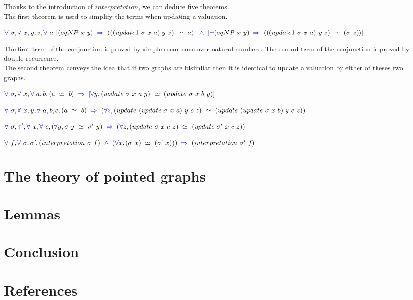 \documentclass[a4paper]{article}
\begin{document}
Thanks to the introduction of $interpretation$, we can deduce five theorems. \\

The first theorem is used to simplify the terms when updating a valuation.

\begin{theorem}
$\fa \ \sigma, \fa \ x, y, z, \fa \ a, [(eqNP \ x \ y) \ \imp \ (((update1 \ \sigma \ x \ a) \ y \ z) \ \simeq \ a)] \ \conj \ [\blneg(eqNP \ x \ y) \ \imp \ (((update1 \ \sigma \ x \ a) \ y \ z) \ \simeq \ (\sigma \ z))]$
\end{theorem}

The first term of the conjonction is proved by simple recurrence over natural numbers. The second term of the conjonction is proved by double recurrence. \\

The second theorem conveys the idea that if two graphs are bisimilar then it is identical to update a valuation by either of theses two graphs.

\begin{theorem}
$\fa \ \sigma, \fa \ x, \fa \ a, b, (a \ \simeq \ b) \ \imp \ [\fa y, (update \ \sigma \ x \ a \ y) \ \simeq \ (update \ \sigma \ x \ b \ y)]$
\end{theorem}

\begin{theorem}
$\fa \ \sigma, \fa \ x, y, \fa \ a, b, c, (a \ \simeq \ b) \ \imp \ (\fa z, (update \ (update \ \sigma \ x \ a) \ y \ c \ z) \ \simeq \ (update \  (update \ \sigma \ x \ b) \ y \ c \ z))$
\end{theorem}

\begin{theorem}
$\fa \ \sigma, \sigma', \fa \ x, \fa \ c, (\fa y, \sigma \ y \ \simeq \ \sigma' \ y) \ \imp \ (\fa z, (update \ \sigma \ x \ c \ z) \ \simeq \ (update \ \sigma' \ x \ c \ z))$
\end{theorem}

\begin{theorem}
$\fa \ f, \fa \ \sigma, \sigma', (interpretation \ \sigma \ f) \ \conj \ (\fa x, (\sigma \ x) \ \simeq \ (\sigma' \ x))) \ \imp \ (interpretation \ \sigma' \ f)$
\end{theorem}

\section{The theory of pointed graphs}


\section{Lemmas}


\section{Conclusion}


\section*{References}
\end{document}
